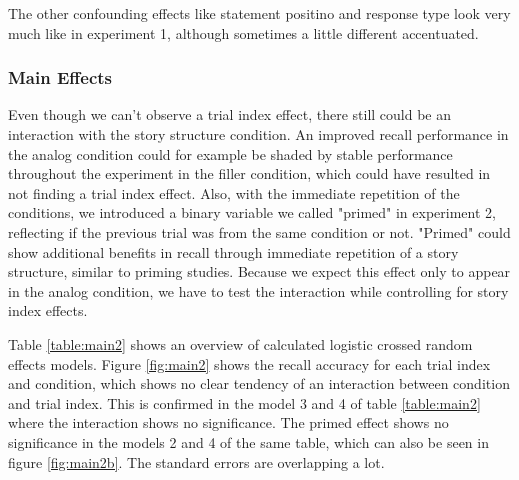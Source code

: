 \documentclass[a4paper,man,natbib,floatsintext,import]{apa6}
\begin{document}
The other confounding effects like statement positino and response type look very much like in experiment 1, although sometimes a little different accentuated.

\subsubsection{Main Effects}



Even though we can't observe a trial index effect, there still could be an interaction with the story structure condition. An improved recall performance in the analog condition could for example be shaded by stable performance throughout the experiment in the filler condition, which could have resulted in not finding a trial index effect. Also, with the immediate repetition of the conditions, we introduced a binary variable we called "primed" in experiment 2, reflecting if the previous trial was from the same condition or not. "Primed" could show additional benefits in recall through immediate repetition of a story structure, similar to priming studies. Because we expect this effect only to appear in the analog condition, we have to test the interaction while controlling for story index effects.

Table \ref{table:main2} shows an overview of calculated logistic crossed random effects models. Figure \ref{fig:main2} shows the recall accuracy for each trial index and condition, which shows no clear tendency of an interaction between condition and trial index. This is confirmed in the model 3 and 4 of table \ref{table:main2} where the interaction shows no significance. The primed effect shows no significance in the models 2 and 4 of the same table, which can also be seen in figure \ref{fig:main2b}. The standard errors are overlapping a lot.
\end{document}
